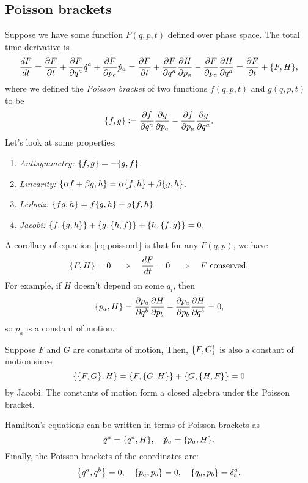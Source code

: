\documentclass{article}
\begin{document}
\subsection{Poisson brackets}
Suppose we have some function $ F(q,p,t) $ defined over phase space. The total time derivative is
\begin{equation} \label{eq:poisson1}
	\dv{F}{t} = \pdv{F}{t} + \pdv{F}{q^{a}} \dot{q}^{a} + \pdv{F}{p_{a}} \dot{p}_{a} = \pdv{F}{t} + \pdv{F}{q^{a}} \pdv{H}{p_{a}} - \pdv{F}{p_{a}} \pdv{H}{q^{a}} = \pdv{F}{t} + \qty{ F, H },
\end{equation}
where we defined the \textit{Poisson bracket} of two functions $ f(q,p,t) $ and $ g(q,p,t) $ to be
\begin{equation}
	\qty{f,g} \vcentcolon= \pdv{f}{q^{a}} \pdv{g}{p_{a}} - \pdv{f}{p_{a}} \pdv{g}{q^{a}}.
\end{equation}
Let's look at some properties:
\begin{enumerate}
	\item \textit{Antisymmetry:} $ \qty{f,g} = - \qty{g,f} $.
	\item \textit{Linearity:} $ \qty{\alpha f + \beta g, h} = \alpha \qty{f,h} + \beta \qty{g, h} $.
	\item \textit{Leibniz:} $ \qty{fg,h} = f\qty{g,h} + g\qty{f,h} $.
	\item \textit{Jacobi:} $ \qty{f,\qty{g,h}} + \qty{g,\qty{h,f}} + \qty{h,\qty{f,g}} = 0. $
\end{enumerate}
A corollary of equation \eqref{eq:poisson1} is that for any $ F(q,p) $, we have
\begin{equation}
	\qty{F,H} = 0 \quad \Rightarrow \quad \dv{F}{t} = 0 \quad \Rightarrow \quad F \text{ conserved.}
\end{equation}
For example, if $ H $ doesn't depend on some $ q_{i} $, then
\[
	\qty{p_{a}, H} = \pdv{p_{a}}{q^{b}} \pdv{H}{p_{b}} - \pdv{p_{a}}{p_{b}} \pdv{H}{q^{b}} = 0,
\]
so $ p_{a} $ is a constant of motion. 
\par
Suppose $ F $ and $ G $ are constants of motion, Then, $ \qty{F,G} $ is also a constant of motion since
\[
	\qty{\qty{F,G}, H} = \qty{F,\qty{G,H}} + \qty{G,\qty{H,F}} = 0
\]
by Jacobi. The constants of motion form a closed algebra under the Poisson bracket.
\par
Hamilton's equations can be written in terms of Poisson brackets as
\begin{equation}
	\dot{q}^{a} = \qty{q^{a}, H}, \quad \dot{p}_{a} = \qty{p_{a}, H}.
\end{equation}
Finally, the Poisson brackets of the coordinates are:
\begin{equation}
	\qty{q^{a}, q^{b}} = 0, \quad \qty{p_{a}, p_{b}} = 0, \quad \qty{q_{a}, p_{b}} = \delta^{a}_{b}.
\end{equation}
\end{document}
